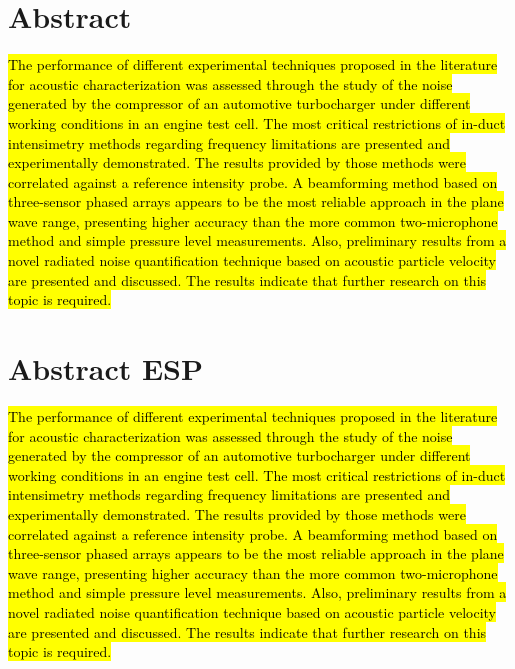 \documentclass[final,twoside,11pt]{book}
\makeatletter
\numberwithin{equation}{section}
\numberwithin{figure}{chapter}
\numberwithin{table}{chapter}
\def\cleardoublepage{\clearpage\if@twoside \ifodd\c@page\else
  \hbox{}
  \thispagestyle{empty}
  \newpage
  \if@twocolumn\hbox{}\newpage\fi\fi\fi}
\makeatother
\begin{document}
\chapter*{Abstract}
\hl{The performance of different experimental techniques proposed in the literature for acoustic characterization was assessed through the study of the noise generated by the compressor of an automotive turbocharger under different working conditions in an engine test cell. The most critical restrictions of in-duct intensimetry methods regarding frequency limitations are presented and experimentally demonstrated. The results provided by those methods were correlated against a reference intensity probe. A beamforming method based on three-sensor phased arrays appears to be the most reliable approach in the plane wave range, presenting higher accuracy than the more common two-microphone method and simple pressure level measurements. Also, preliminary results from a novel radiated noise quantification technique based on acoustic particle velocity are presented and discussed. The results indicate that further research on this topic is required.}
\cleardoublepage

\chapter*{Abstract ESP}
\hl{The performance of different experimental techniques proposed in the literature for acoustic characterization was assessed through the study of the noise generated by the compressor of an automotive turbocharger under different working conditions in an engine test cell. The most critical restrictions of in-duct intensimetry methods regarding frequency limitations are presented and experimentally demonstrated. The results provided by those methods were correlated against a reference intensity probe. A beamforming method based on three-sensor phased arrays appears to be the most reliable approach in the plane wave range, presenting higher accuracy than the more common two-microphone method and simple pressure level measurements. Also, preliminary results from a novel radiated noise quantification technique based on acoustic particle velocity are presented and discussed. The results indicate that further research on this topic is required.}
\cleardoublepage

\end{document}
